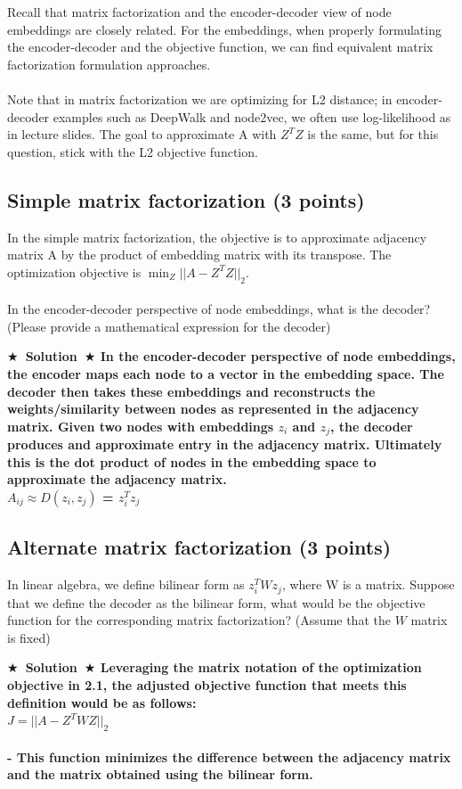 \documentclass{article}
\numberwithin{figure}{section}
\newcommand{\Solution}[1]{{\medskip \color{red} \bf $\bigstar$~\sf \textbf{Solution}~$\bigstar$ \sf #1 } \bigskip}
\begin{document}
Recall that matrix factorization and the encoder-decoder view of node embeddings are closely related. For the embeddings, when properly formulating the encoder-decoder and the objective function, we can find equivalent matrix factorization formulation approaches.\\
\\
    Note that in matrix factorization we are optimizing for L2 distance; in encoder-decoder examples such as DeepWalk and node2vec, we often use log-likelihood as in lecture slides. The goal to approximate A with $Z^TZ$ is the same, but for this question, stick with the L2 objective function.
\subsection{Simple matrix factorization (3 points)}
In the simple matrix factorization, the objective is to approximate adjacency matrix A by the product of embedding matrix with its transpose. The optimization objective is $\min_Z ||A - Z^TZ||_2$.\\
\\
In the encoder-decoder perspective of node embeddings, what is the decoder? (Please provide a mathematical expression for the decoder)

\Solution{In the encoder-decoder perspective of node embeddings, the encoder maps each node to a vector in the embedding space. The decoder then takes these embeddings and reconstructs the weights/similarity between nodes as represented in the adjacency matrix. Given two nodes with embeddings $z_i$ and $z_j$, the decoder produces and approximate entry in the adjacency matrix. Ultimately this is the dot product of nodes in the embedding space to approximate the adjacency matrix.
\\
\( A_{ij} \approx D(z_i,z_j) \) = $z_i^Tz_j$}



\subsection{Alternate matrix factorization (3 points)}
In linear algebra, we define bilinear form as $z_i^T W z_j$, where W is a matrix. Suppose that we define the decoder as the bilinear form, what would be the objective function for the corresponding matrix factorization? (Assume that the $W$ matrix is fixed)

\Solution{ Leveraging the matrix notation of the optimization objective in 2.1, the adjusted objective function that meets this definition would be as follows:\\

$J = || A - Z^{T}WZ||_2$
\\\\
- This function minimizes the difference between the adjacency matrix and the matrix obtained using the bilinear form.


}
\end{document}
